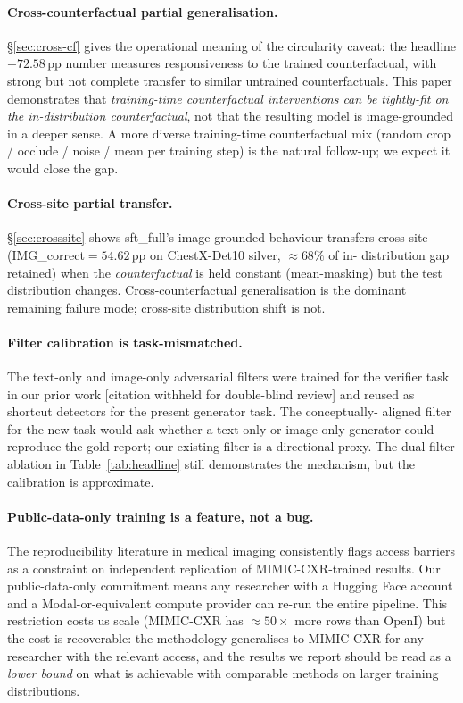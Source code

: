 \documentclass{article}
\begin{document}
\paragraph{Cross-counterfactual partial generalisation.} \S\ref{sec:cross-cf}
gives the operational meaning of the circularity caveat: the headline
$+72.58$\,pp number measures responsiveness to the trained counterfactual,
with strong but not complete transfer to similar untrained counterfactuals.
This paper demonstrates that \emph{training-time counterfactual
interventions can be tightly-fit on the in-distribution counterfactual},
not that the resulting model is image-grounded in a deeper sense. A more
diverse training-time counterfactual mix (random crop / occlude / noise /
mean per training step) is the natural follow-up; we expect it would close
the gap.

\paragraph{Cross-site partial transfer.} \S\ref{sec:crosssite} shows
sft\_full's image-grounded behaviour transfers cross-site
(IMG\_correct$=54.62$\,pp on ChestX-Det10 silver, $\approx 68\%$ of in-
distribution gap retained) when the \emph{counterfactual} is held constant
(mean-masking) but the test distribution changes. Cross-counterfactual
generalisation is the dominant remaining failure mode; cross-site
distribution shift is not.

\paragraph{Filter calibration is task-mismatched.} The text-only and
image-only adversarial filters were trained for the verifier task in our
prior work [citation withheld for double-blind review] and reused as
shortcut detectors for the present generator task. The conceptually-
aligned filter for the new task would ask whether a text-only or
image-only generator could reproduce the gold report; our existing filter
is a directional proxy. The dual-filter ablation in
Table~\ref{tab:headline} still demonstrates the mechanism, but the
calibration is approximate.

\paragraph{Public-data-only training is a feature, not a bug.} The
reproducibility literature in medical imaging consistently flags
access barriers as a constraint on independent replication of
MIMIC-CXR-trained results. Our public-data-only commitment means any
researcher with a Hugging Face account and a Modal-or-equivalent compute
provider can re-run the entire pipeline. This restriction costs us scale
(MIMIC-CXR has $\approx 50\times$ more rows than OpenI) but the cost is
recoverable: the methodology generalises to MIMIC-CXR for any researcher
with the relevant access, and the results we report should be read as a
\emph{lower bound} on what is achievable with comparable methods on
larger training distributions.
\end{document}
